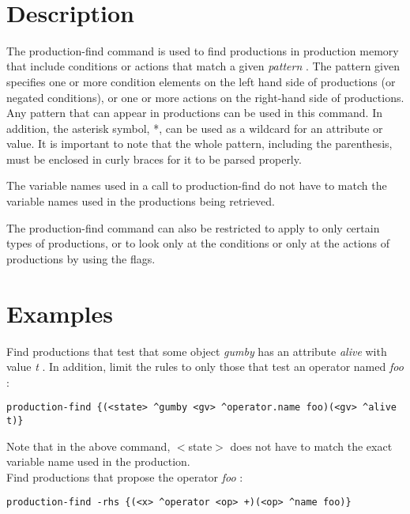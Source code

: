 \documentclass[10pt]{article}
\begin{document}
 \\ 

\section*{ Description }


 The production-find command is used to find productions in production memory that include conditions or actions that match a given \emph{pattern}
. The pattern given specifies one or more condition elements on the left hand side of productions (or negated conditions), or one or more actions on the right-hand side of productions. Any pattern that can appear in productions can be used in this command. In addition, the asterisk symbol, *, can be used as a wildcard for an attribute or value. It is important to note that the whole pattern, including the parenthesis, must be enclosed in curly braces for it to be parsed properly. 


 The variable names used in a call to production-find do not have to match the variable names used in the productions being retrieved. 


 The production-find command can also be restricted to apply to only certain types of productions, or to look only at the conditions or only at the actions of productions by using the flags. 
\section*{ Examples }


 Find productions that test that some object \emph{gumby}
 has an attribute \emph{alive}
 with value \emph{t}
. In addition, limit the rules to only those that test an operator named \emph{foo}
: \begin{verbatim}
production-find {(<state> ^gumby <gv> ^operator.name foo)(<gv> ^alive t)} 

\end{verbatim}



 Note that in the above command, $<$state$>$ does not have to match the exact variable name used in the production. \\ 



 Find productions that propose the operator \emph{foo}
: \begin{verbatim}
production-find -rhs {(<x> ^operator <op> +)(<op> ^name foo)}

\end{verbatim}
\end{document}
